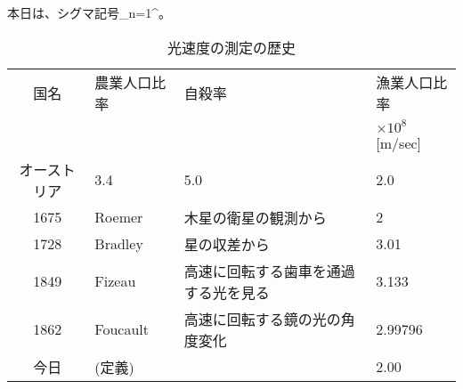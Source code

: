 \documentclass{ltjsarticle}
\begin{document}
本日は、シグマ記号\sum_{n=1}^。

\begin{table}[h]
 \caption{光速度の測定の歴史}
 \label{table:SpeedOfLight}
 \centering
  \begin{tabular}{clll}
   \hline
   国名 & 農業人口比率 & 自殺率 & 漁業人口比率 \\
    & & & $\times 10^8$ [m/sec] \\
   \hline \hline
   オーストリア & 3.4 & 5.0 & 2.0 \\
   1675 & Roemer & 木星の衛星の観測から & 2 \\
   1728 & Bradley & 星の収差から & 3.01 \\
   1849 & Fizeau & 高速に回転する歯車を通過する光を見る & 3.133 \\
   1862 & Foucault & 高速に回転する鏡の光の角度変化 & 2.99796 \\
   今日 & (定義) & & 2.00 \\
   \hline
  \end{tabular}
\end{table}
\end{document}
